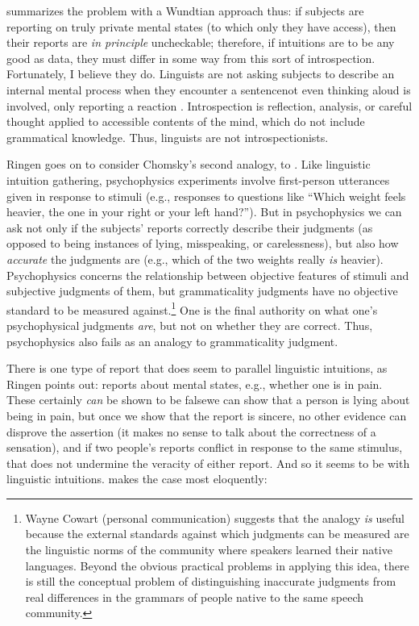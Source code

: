 \citet{Ringen1977} summarizes the problem with a Wundtian approach thus: if subjects are reporting on truly private mental states (to which only they have access), then their reports are \textit{in principle} uncheckable; therefore, if intuitions are to be any good as data, they must differ in some way from this sort of introspection. Fortunately, I believe they do. Linguists are not asking subjects to describe an internal mental process when they encounter a sentence\schdash{}not even thinking aloud is involved, only reporting a reaction \citep{Cohen1981}. Introspection is reflection, analysis, or careful thought applied to accessible contents of the mind, which do not include grammatical knowledge. Thus, linguists are not introspectionists.

Ringen goes on to consider Chomsky's second analogy, to . Like linguistic intuition gathering, psychophysics experiments involve first-person utterances given in response to stimuli (e.g., responses to questions like ``Which weight feels heavier, the one in your right or your left hand?''). But in psychophysics we can ask not only if the subjects' reports correctly describe their judgments (as opposed to being instances of lying, misspeaking, or carelessness), but also how \textit{accurate} the judgments are (e.g., which of the two weights really \textit{is} heavier). Psychophysics concerns the relationship between objective features of stimuli and subjective judgments of them, but grammaticality judgments have no objective standard to be measured against.\footnote{Wayne Cowart (personal communication) suggests that the analogy \textit{is} useful because the external standards against which judgments can be measured are the linguistic norms of the community where speakers learned their native languages. Beyond the obvious practical problems in applying this idea, there is still the conceptual problem of distinguishing inaccurate judgments from real differences in the grammars of people native to the same speech community.
}
 One is the final authority on what one's psychophysical judgments \textit{are}, but not on whether they are correct. Thus, psychophysics also fails as an analogy to grammaticality judgment.

There is one type of report that does seem to parallel linguistic intuitions, as Ringen points out: reports about mental states, e.g., whether one is in pain. These certainly \textit{can} be shown to be false\schdash{}we can show that a person is lying about being in pain, but once we show that the report is sincere, no other evidence can
disprove the assertion (it makes no sense to talk about the correctness of a sensation), and if two people's reports conflict in response to the same stimulus, that does not undermine the veracity of either report. And so it seems to be with linguistic intuitions. \citet{Pateman1987} makes the case most eloquently:

